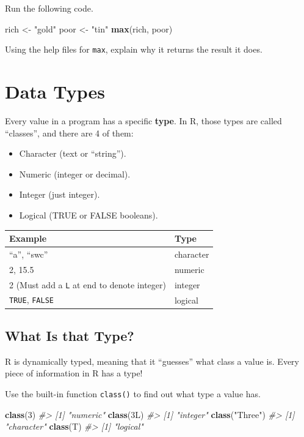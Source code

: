 \documentclass[]{book}
\newenvironment{Shaded}{\begin{snugshade}}{\end{snugshade}}
\newcommand{\KeywordTok}[1]{\textcolor[rgb]{0.13,0.29,0.53}{\textbf{#1}}}
\newcommand{\DecValTok}[1]{\textcolor[rgb]{0.00,0.00,0.81}{#1}}
\newcommand{\StringTok}[1]{\textcolor[rgb]{0.31,0.60,0.02}{#1}}
\newcommand{\CommentTok}[1]{\textcolor[rgb]{0.56,0.35,0.01}{\textit{#1}}}
\newcommand{\NormalTok}[1]{#1}
\providecommand{\tightlist}{%
  \setlength{\itemsep}{0pt}\setlength{\parskip}{0pt}}
\begin{document}
Run the following code.

\begin{Shaded}
\begin{Highlighting}[]
\NormalTok{rich <-}\StringTok{ "gold"}
\NormalTok{poor <-}\StringTok{ "tin"}
\KeywordTok{max}\NormalTok{(rich, poor)}
\end{Highlighting}
\end{Shaded}

Using the help files for \texttt{max}, explain why it returns the result
it does.

\section{Data Types}\label{data-types}

Every value in a program has a specific \textbf{type}. In R, those types
are called ``classes'', and there are 4 of them:

\begin{itemize}
\tightlist
\item
  Character (text or ``string'').
\item
  Numeric (integer or decimal).
\item
  Integer (just integer).
\item
  Logical (TRUE or FALSE booleans).
\end{itemize}

\begin{longtable}[]{@{}ll@{}}
\toprule
Example & Type\tabularnewline
\midrule
\endhead
``a'', ``swc'' & character\tabularnewline
2, 15.5 & numeric\tabularnewline
2 (Must add a \texttt{L} at end to denote integer) &
integer\tabularnewline
\texttt{TRUE}, \texttt{FALSE} & logical\tabularnewline
\bottomrule
\end{longtable}

\subsection{What Is that Type?}\label{what-is-that-type}

R is dynamically typed, meaning that it ``guesses'' what class a value
is. Every piece of information in R has a type!

Use the built-in function \texttt{class()} to find out what type a value
has.

\begin{Shaded}
\begin{Highlighting}[]
\KeywordTok{class}\NormalTok{(}\DecValTok{3}\NormalTok{)}
\CommentTok{#> [1] "numeric"}
\KeywordTok{class}\NormalTok{(3L)}
\CommentTok{#> [1] "integer"}
\KeywordTok{class}\NormalTok{(}\StringTok{"Three"}\NormalTok{)}
\CommentTok{#> [1] "character"}
\KeywordTok{class}\NormalTok{(T)}
\CommentTok{#> [1] "logical"}
\end{Highlighting}
\end{Shaded}
\end{document}
